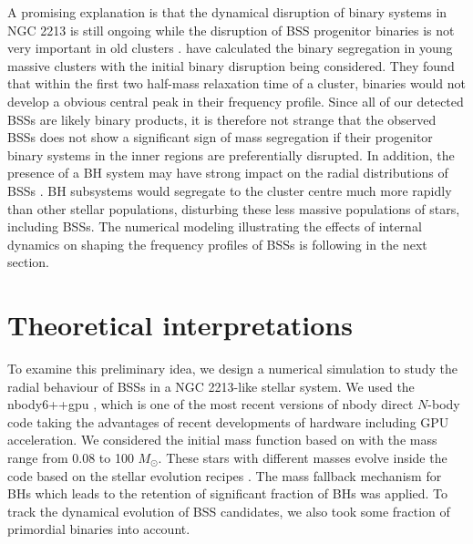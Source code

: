 \documentclass[useAMS,usenatbib,twocolumn]{mnras}
\begin{document}
A promising explanation is that the dynamical disruption of binary systems in NGC 2213 is still ongoing  while the disruption of BSS progenitor binaries is not very important in old clusters \citep[see e.g.,][]{2013AJ....145....8G}. \cite{Gell13a} have calculated the binary segregation in young massive clusters with the initial binary disruption being considered. They found that within the first two half-mass relaxation time of a cluster, binaries would not develop a obvious central peak in their frequency profile. Since all of our detected BSSs are likely binary products, it is therefore not strange that the observed BSSs does not show a significant sign of mass segregation if their progenitor binary systems in the inner regions are preferentially disrupted. In addition, the presence of a BH system may have strong impact on the radial distributions of BSSs \citep{2016ApJ...833..252A,2016MNRAS.462.2333P}. BH subsystems would segregate to the cluster centre much more rapidly than other stellar populations, disturbing these less massive populations of stars, including BSSs. The numerical modeling illustrating the effects of internal dynamics on shaping the frequency profiles of BSSs is following in the next section.


\section{Theoretical interpretations\label{S5}}

To examine this preliminary idea, we design a numerical simulation to study the radial behaviour of BSSs in a NGC 2213-like stellar system. We used the {\sc nbody6++gpu} \citep{2015MNRAS.450.4070W}, which is one of the most recent versions of {\sc nbody} \citep{2003gnbs.book.....A} direct $N$-body code taking the advantages of recent developments of hardware including GPU acceleration.
 We considered the initial mass function based on \citet{Krou01a} with the mass range from 0.08 to 100 $M_{\odot}$. These stars with different masses evolve inside the code based on the stellar evolution recipes \citep{2000MNRAS.315..543H,2002MNRAS.329..897H}. The mass fallback mechanism \citep{2002ApJ...572..407B} for BHs which leads to the retention of significant fraction of BHs was applied. To track the dynamical evolution of BSS candidates, we also took some fraction of primordial binaries into account.
\end{document}
